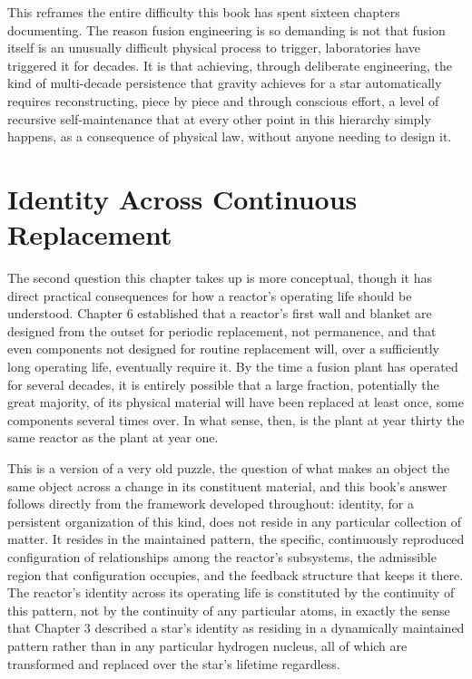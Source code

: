 This reframes the entire difficulty this book has spent sixteen chapters documenting. The reason fusion engineering is so demanding is not that fusion itself is an unusually difficult physical process to trigger, laboratories have triggered it for decades. It is that achieving, through deliberate engineering, the kind of multi-decade persistence that gravity achieves for a star automatically requires reconstructing, piece by piece and through conscious effort, a level of recursive self-maintenance that at every other point in this hierarchy simply happens, as a consequence of physical law, without anyone needing to design it.

\section{Identity Across Continuous Replacement}

The second question this chapter takes up is more conceptual, though it has direct practical consequences for how a reactor's operating life should be understood. Chapter 6 established that a reactor's first wall and blanket are designed from the outset for periodic replacement, not permanence, and that even components not designed for routine replacement will, over a sufficiently long operating life, eventually require it. By the time a fusion plant has operated for several decades, it is entirely possible that a large fraction, potentially the great majority, of its physical material will have been replaced at least once, some components several times over. In what sense, then, is the plant at year thirty the same reactor as the plant at year one.

This is a version of a very old puzzle, the question of what makes an object the same object across a change in its constituent material, and this book's answer follows directly from the framework developed throughout: identity, for a persistent organization of this kind, does not reside in any particular collection of matter. It resides in the maintained pattern, the specific, continuously reproduced configuration of relationships among the reactor's subsystems, the admissible region that configuration occupies, and the feedback structure that keeps it there. The reactor's identity across its operating life is constituted by the continuity of this pattern, not by the continuity of any particular atoms, in exactly the sense that Chapter 3 described a star's identity as residing in a dynamically maintained pattern rather than in any particular hydrogen nucleus, all of which are transformed and replaced over the star's lifetime regardless.

